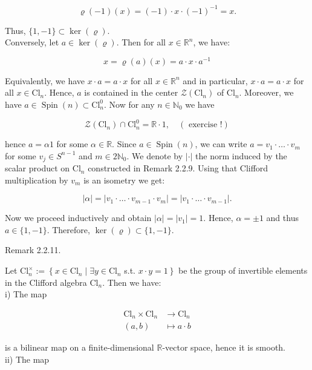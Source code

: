\documentclass[10pt, letterpaper]{article}
\begin{document}
$$
\varrho(-1)(x)=(-1) \cdot x \cdot(-1)^{-1}=x .
$$

Thus, $\{1,-1\} \subset \operatorname{ker}(\varrho)$.\\
Conversely, let $a \in \operatorname{ker}(\varrho)$. Then for all $x \in \mathbb{R}^{n}$, we have:

$$
x=\varrho(a)(x)=a \cdot x \cdot a^{-1}
$$

Equivalently, we have $x \cdot a=a \cdot x$ for all $x \in \mathbb{R}^{n}$ and in particular, $x \cdot a=a \cdot x$ for all $x \in \mathrm{Cl}_{n}$. Hence, $a$ is contained in the center $\mathcal{Z}\left(\mathrm{Cl}_{n}\right)$ of $\mathrm{Cl}_{n}$. Moreover, we have $a \in \operatorname{Spin}(n) \subset \mathrm{Cl}_{n}^{0}$. Now for any $n \in \mathbb{N}_{0}$ we have

$$
\mathcal{Z}\left(\mathrm{Cl}_{n}\right) \cap \mathrm{Cl}_{n}^{0}=\mathbb{R} \cdot 1, \quad(\text { exercise }!)
$$

hence $a=\alpha 1$ for some $\alpha \in \mathbb{R}$. Since $a \in \operatorname{Spin}(n)$, we can write $a=v_{1} \cdot \ldots \cdot v_{m}$ for some $v_{j} \in S^{n-1}$ and $m \in 2 \mathbb{N}_{0}$. We denote by $|\cdot|$ the norm induced by the scalar product on $\mathrm{Cl}_{n}$ constructed in Remark 2.2.9. Using that Clifford multiplication by $v_{m}$ is an isometry we get:

$$
|\alpha|=\left|v_{1} \cdot \ldots \cdot v_{m-1} \cdot v_{m}\right|=\left|v_{1} \cdot \ldots \cdot v_{m-1}\right| .
$$

Now we proceed inductively and obtain $|\alpha|=\left|v_{1}\right|=1$. Hence, $\alpha= \pm 1$ and thus $a \in\{1,-1\}$. Therefore, $\operatorname{ker}(\varrho) \subset\{1,-1\}$.

Remark 2.2.11.

Let $\mathrm{Cl}_{n}^{\times}:=\left\{x \in \mathrm{Cl}_{n} \mid \exists y \in \mathrm{Cl}_{n}\right.$ s.t. $\left.x \cdot y=1\right\}$ be the group of invertible elements in the Clifford algebra $\mathrm{Cl}_{n}$. Then we have:\\
i) The map

$$
\begin{aligned}
\mathrm{Cl}_{n} \times \mathrm{Cl}_{n} & \rightarrow \mathrm{Cl}_{n} \\
(a, b) & \mapsto a \cdot b
\end{aligned}
$$

is a bilinear map on a finite-dimensional $\mathbb{R}$-vector space, hence it is smooth.\\
ii) The map
\end{document}
